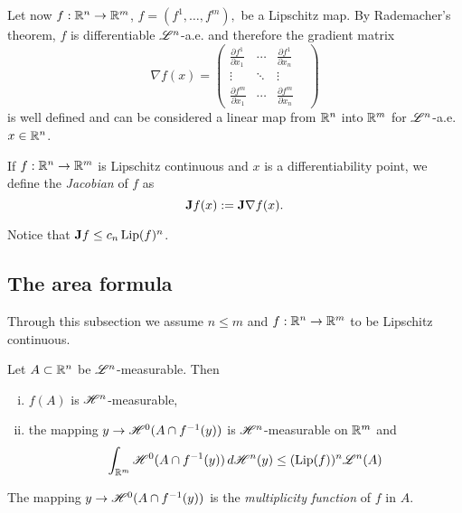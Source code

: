 Let now $f : \mathbb{R}^{n} \to \mathbb{R}^{m}$, $f = (f^{1}, \dots, f^{m}),$ be a Lipschitz map. By Rademacher's theorem, $f$ is differentiable $\mathscr{L}^{n}$-a.e. and therefore the gradient matrix 
\[\nabla f(x) = \begin{pmatrix} \frac{\partial f^{1}}{\partial x_{1}} & \cdots & \frac{\partial f^{1}}{\partial x_{n}} & \\ \vdots & \ddots & \vdots \\  \frac{\partial f^{m}}{\partial x_{1}} & \cdots & \frac{\partial f^{m}}{\partial x_{n}} & \end{pmatrix}\]
is well defined and can be considered a linear map from $\mathbb{R}^{n}$ into $\mathbb{R}^{m}$ for $\mathscr{L}^{n}$-a.e. $x \in \mathbb{R}^{n}$.

\begin{definition}
If $f : \mathbb{R}^{n} \to \mathbb{R}^{m}$ is Lipschitz continuous and $x$ is a differentiability point, we define the {\em Jacobian} of $f$ as $${\bf J} f(x) := {\bf J} \nabla f(x).$$
\end{definition}

\begin{remark}
Notice that ${\bf J} f \le c_n \operatorname{Lip}(f)^{n}$.
\end{remark}

\subsection{The area formula}

Through this subsection we assume $n \le m$ and $f : \mathbb{R}^{n} \to \mathbb{R}^{m}$ to be Lipschitz continuous.

\begin{lemma} Let $A \subset \mathbb{R}^{n}$ be $\mathscr{L}^{n}$-measurable. Then
\begin{enumerate}[i)]
\item $f(A)$ is $\mathscr{H}^{n}$-measurable,
\item the mapping $y \to \mathscr{H}^{0}(A \cap f^{-1}(y))$ is $\mathscr{H}^{n}$-measurable on $\mathbb{R}^{m}$ and
\begin{equation*}
\int_{\mathbb{R}^{m}} \mathscr{H}^{0}(A \cap f^{-1}(y)) \, d \mathscr{H}^{n}(y) \le (\operatorname{Lip}(f))^{n} \mathscr{L}^{n}(A)
\end{equation*}
\end{enumerate}
\end{lemma}

\begin{definition}
The mapping $y \to \mathscr{H}^{0}(A \cap f^{-1}(y))$ is the {\em multiplicity function} of $f$ in $A$.
\end{definition}

